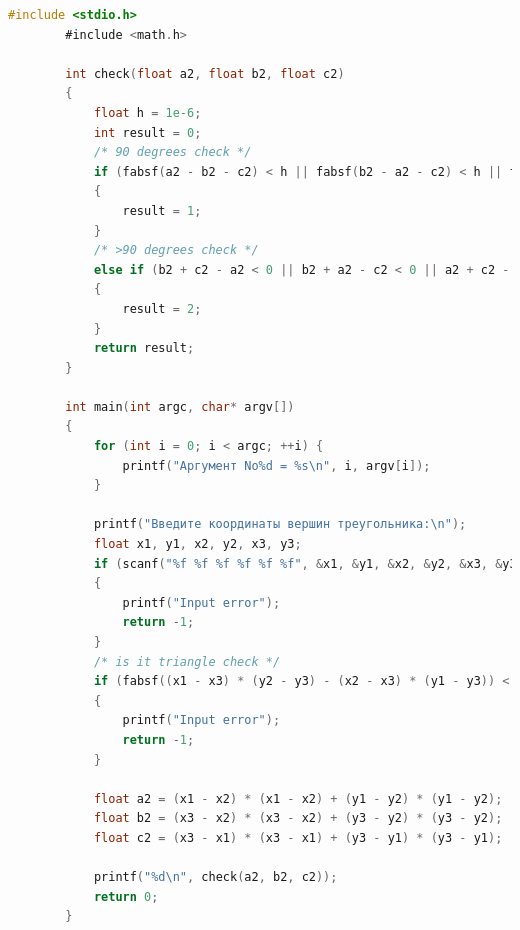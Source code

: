\documentclass[12pt]{report}
\begin{document}
	\begin{lstlisting}[label=code:my_test2, caption={Код программы triangle\_type}, language=C]
		#include <stdio.h>
		#include <math.h>
		
		int check(float a2, float b2, float c2)
		{
			float h = 1e-6;
			int result = 0;
			/* 90 degrees check */
			if (fabsf(a2 - b2 - c2) < h || fabsf(b2 - a2 - c2) < h || fabsf(c2 - b2 - a2) < h)
			{
				result = 1;
			}
			/* >90 degrees check */
			else if (b2 + c2 - a2 < 0 || b2 + a2 - c2 < 0 || a2 + c2 - b2 < 0)
			{
				result = 2;
			}
			return result;
		}
		
		int main(int argc, char* argv[])
		{
			for (int i = 0; i < argc; ++i) {
				printf("Аргумент No%d = %s\n", i, argv[i]);
			}
			
			printf("Введите координаты вершин треугольника:\n");
			float x1, y1, x2, y2, x3, y3;
			if (scanf("%f %f %f %f %f %f", &x1, &y1, &x2, &y2, &x3, &y3) != 6)
			{
				printf("Input error");
				return -1;
			}
			/* is it triangle check */
			if (fabsf((x1 - x3) * (y2 - y3) - (x2 - x3) * (y1 - y3)) < 1e-6)
			{
				printf("Input error");
				return -1;
			}
			
			float a2 = (x1 - x2) * (x1 - x2) + (y1 - y2) * (y1 - y2);
			float b2 = (x3 - x2) * (x3 - x2) + (y3 - y2) * (y3 - y2);
			float c2 = (x3 - x1) * (x3 - x1) + (y3 - y1) * (y3 - y1);
			
			printf("%d\n", check(a2, b2, c2));
			return 0;
		}
	\end{lstlisting}
	
\end{document}
